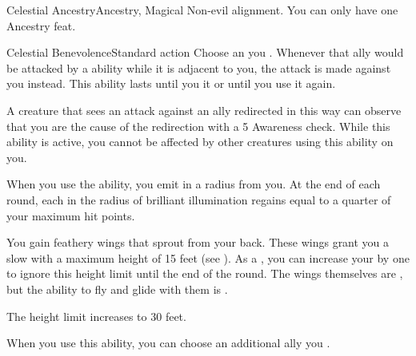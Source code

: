   \begin{magicalfeat}{Celestial Ancestry}{Ancestry, Magical}
    \featpre Non-evil alignment.
     You can only have one Ancestry feat.

    \begin{magicalactiveability}{Celestial Benevolence}{Standard action}
        \abilitytags {}
        \rankline
        Choose an  you .
        Whenever that ally would be attacked by a  ability while it is adjacent to you, the attack is made against you instead.
        This ability lasts until you  it or until you use it again.

        A creature that sees an attack against an ally redirected in this way can observe that you are the cause of the redirection with a  5 Awareness check.
        While this ability is active, you cannot be affected by other creatures using this ability on you.
    \end{magicalactiveability}

     When you use the  ability, you  emit  in a \largearea radius  from you.
    At the end of each round, each  in the radius of brilliant illumination regains  equal to a quarter of your maximum hit points.

     You gain feathery wings that sprout from your back.
    These wings grant you a slow  with a maximum height of 15 feet (see ).
    As a , you can increase your  by one to ignore this height limit until the end of the round.
    The wings themselves are , but the ability to fly and glide with them is \magical.

     The height limit increases to 30 feet.

     When you use this ability, you can choose an additional ally you .
  \end{magicalfeat}

